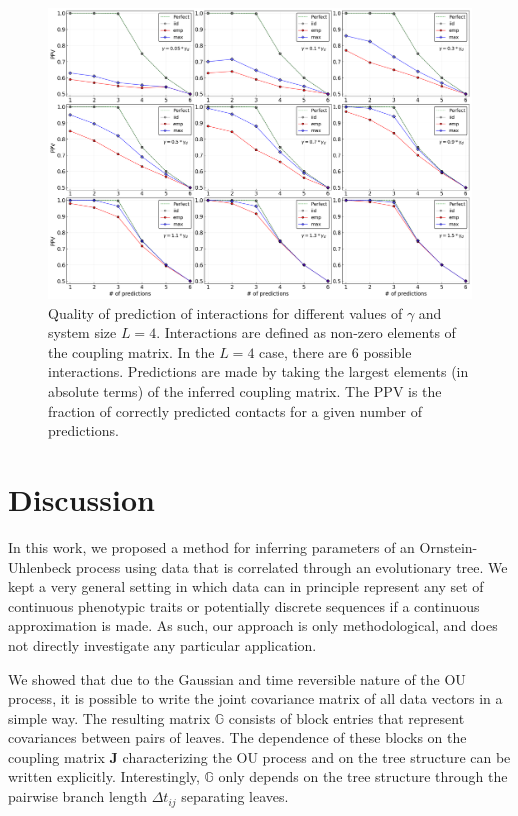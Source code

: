 \documentclass[preprint,amsmath,amssymb,superscriptaddress,showpacs,pre]{revtex4-1}
\begin{document}
\begin{figure}[!htb]
	\centering
	\includegraphics[keepaspectratio=true,width=1.0\textwidth]{Figures/PPVs_L4.png}
	\caption{Quality of prediction of interactions for  different values of $\gamma$ and system size $L=4$. Interactions are defined as non-zero elements of the coupling matrix. In the $L=4$ case, there are $6$ possible interactions. Predictions are made by taking the largest elements (in absolute terms) of the inferred coupling matrix. The PPV is the fraction of correctly predicted contacts for a given number of predictions.}
	\label{fig:PPV_L4}
\end{figure}


  



\section{Discussion}
\label{sec:discussion}

In this work, we proposed a method for inferring parameters of an Ornstein-Uhlenbeck process using data that is correlated through an evolutionary tree. 
We kept a very general setting in which data can in principle represent any set of continuous phenotypic traits or potentially discrete sequences if a continuous approximation is made. 
As such, our approach is only methodological, and does not directly investigate any particular application. 

We showed that due to the Gaussian and time reversible nature of the OU process, it is possible to write the joint covariance matrix of all data vectors in a simple way. 
The resulting matrix $\mathbb{G}$ consists of block entries that represent covariances between pairs of leaves.
The dependence of these blocks on the coupling matrix $\bm{J}$ characterizing the OU process and on the tree structure can be written explicitly. 
Interestingly, $\mathbb{G}$ only depends on the tree structure through the pairwise branch length $\Delta t_{ij}$ separating leaves.
\end{document}
